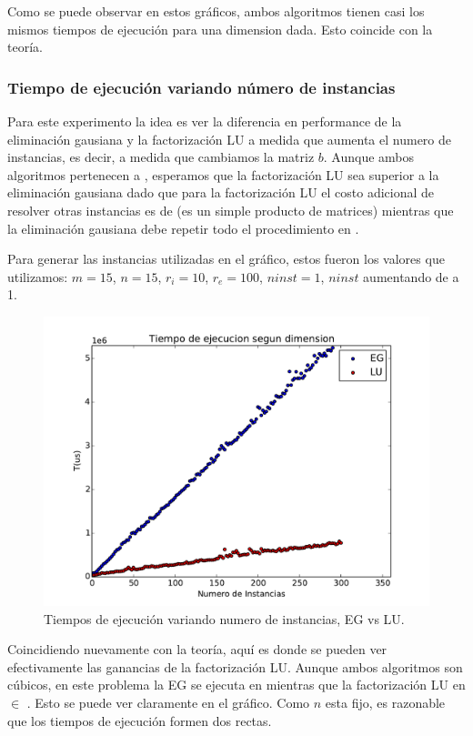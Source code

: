 Como se puede observar en estos gráficos, ambos algoritmos tienen casi los mismos tiempos de ejecución para una dimension dada. Esto coincide con la teoría.

\pagebreak

\subsubsection{Tiempo de ejecución variando número de instancias}

Para este experimento la idea es ver la diferencia en performance de la eliminación gausiana y la factorización LU a medida que aumenta el numero de instancias, es decir, a medida que cambiamos la matriz $b$. Aunque ambos algoritmos pertenecen a , esperamos que la factorización LU sea superior a la eliminación gausiana dado que para la factorización LU el costo adicional de resolver otras instancias es de  (es un simple producto de matrices) mientras que la eliminación gausiana debe repetir todo el procedimiento en .

Para generar las instancias utilizadas en el gráfico, estos fueron los valores que utilizamos: $m = 15$, $n = 15$, $r_i = 10$, $r_e = 100$, $ninst = 1$, $ninst$ aumentando de a 1.

\begin{figure}[h]
\centering
\includegraphics[scale=0.7]{graficos/ninstVariable.pdf}
\caption{Tiempos de ejecución variando numero de instancias, EG vs LU.}
\end{figure}

Coincidiendo nuevamente con la teoría, aquí es donde se pueden ver efectivamente las ganancias de la factorización LU. Aunque ambos algoritmos son cúbicos, en este problema la EG se ejecuta en  mientras que la factorización LU en  $\in$ . Esto se puede ver claramente en el gráfico. Como $n$ esta fijo, es razonable que los tiempos de ejecución formen dos rectas.

